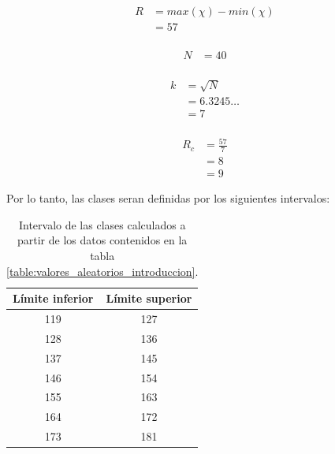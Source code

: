 \begin{minipage}{0.25\linewidth}
    \begin{align*}
        R & =max(\chi)-min(\chi) \\
          & = 57                 \\
    \end{align*}
\end{minipage}
\begin{minipage}{0.25\linewidth}
    \begin{align*}
        N & =40 \\
    \end{align*}
\end{minipage}
\begin{minipage}{0.25\linewidth}
    \begin{align*}
        k & =\sqrt{N}    \\
          & =6.3245\dots \\
          & =7           \\
    \end{align*}
\end{minipage}
\begin{minipage}{0.25\linewidth}
    \begin{align}
        R_c & = \frac{57}{7} \nonumber      \\
            & = 8            \nonumber      \\
            & =9             \label{eq:r_c}
    \end{align}
\end{minipage}
Por lo tanto, las clases seran definidas por los siguientes intervalos:
\begin{table}[H]
    \centering
    \begin{tabular}{cc}
        \hline
        Límite inferior & Límite superior \\ \hline
        119             & 127             \\
        128             & 136             \\
        137             & 145             \\
        146             & 154             \\
        155             & 163             \\
        164             & 172             \\
        173             & 181             \\ \hline
    \end{tabular}
    \caption{Intervalo de las clases calculados a partir de los datos contenidos en la tabla \ref{table:valores_aleatorios_introduccion}. }
    \label{table:intervalo_de_clases_introduccion}
\end{table}
